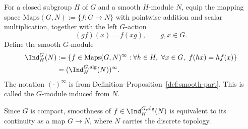 \begin{definition}
	For a closed subgroup $H$ of $G$ and a smooth $H$-module $N$, equip the
	mapping space $\mathrm{Maps}(G,N):=\{f:G\to N\}$ with pointwise addition
	and scalar multiplication, together with the left $G$-action
	\[ (gf)(x)=f(xg),\qquad g,x\in G. \]
	Define the smooth $G$-module
	\begin{align*}
		\Ind^G_H(N)&:=\{f\in\mathrm{Maps}(G,N)^\infty:
		\forall h\in H,\ \forall x\in G,\ f(hx)=hf(x)\}\\
		&=(\Ind^{G,\mathrm{alg}}_H(N))^\infty.
	\end{align*}
	The notation $(\cdot)^\infty$ is from
	Definition--Proposition~\ref{def:smooth-part}. This is called the
	$G$-module induced from $N$.
\end{definition}

Since $G$ is compact, smoothness of
$f\in\Ind^{G,\mathrm{alg}}_H(N)$ is equivalent to its continuity as a map
$G\to N$, where $N$ carries the discrete topology.

